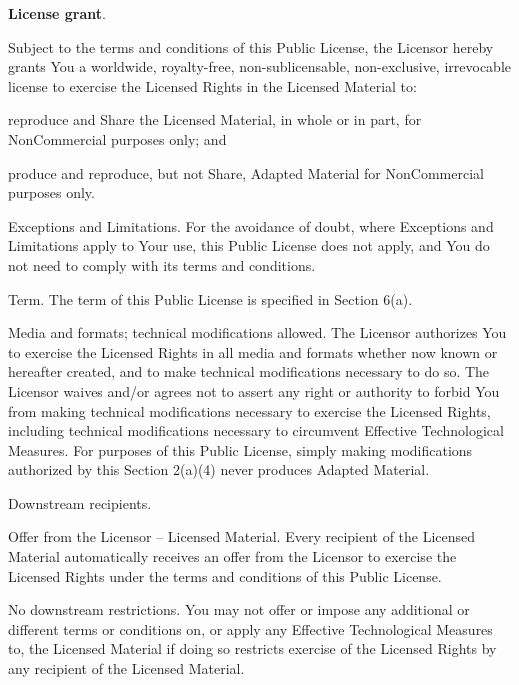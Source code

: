 \begin{doclicense@enumerate}
\item \textbf{License grant}.
\begin{doclicense@enumerate}
\item Subject to the terms and conditions of this Public License, the Licensor hereby grants You a worldwide, royalty-free, non-sublicensable, non-exclusive, irrevocable license to exercise the Licensed Rights in the Licensed Material to:
\begin{doclicense@enumerate}
\item reproduce and Share the Licensed Material, in whole or in part, for NonCommercial purposes only; and
\item produce and reproduce, but not Share, Adapted Material for NonCommercial purposes only.
\end{doclicense@enumerate}
\item Exceptions and Limitations. For the avoidance of doubt, where Exceptions and Limitations apply to Your use, this Public License does not apply, and You do not need to comply with its terms and conditions.
\item Term. The term of this Public License is specified in Section 6(a).
\item Media and formats; technical modifications allowed. The Licensor authorizes You to exercise the Licensed Rights in all media and formats whether now known or hereafter created, and to make technical modifications necessary to do so. The Licensor waives and/or agrees not to assert any right or authority to forbid You from making technical modifications necessary to exercise the Licensed Rights, including technical modifications necessary to circumvent Effective Technological Measures. For purposes of this Public License, simply making modifications authorized by this Section 2(a)(4) never produces Adapted Material.
\item Downstream recipients.

\begin{doclicense@enumerate}
\item Offer from the Licensor – Licensed Material. Every recipient of the Licensed Material automatically receives an offer from the Licensor to exercise the Licensed Rights under the terms and conditions of this Public License.
\item No downstream restrictions. You may not offer or impose any additional or different terms or conditions on, or apply any Effective Technological Measures to, the Licensed Material if doing so restricts exercise of the Licensed Rights by any recipient of the Licensed Material.
\end{doclicense@enumerate}


\end{doclicense@enumerate}
\end{doclicense@enumerate}
